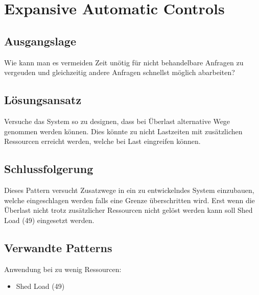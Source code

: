 \section{Expansive Automatic Controls}

\subsection{Ausgangslage}

Wie kann man es vermeiden Zeit unötig für nicht behandelbare Anfragen zu vergeuden und gleichzeitig andere Anfragen schnellst möglich abarbeiten?

\subsection{Lösungsansatz}

Versuche das System so zu designen, dass bei Überlast alternative Wege genommen werden können. Dies könnte zu nicht Lastzeiten mit zusätzlichen Ressourcen erreicht werden, welche bei Last eingreifen können.

\subsection{Schlussfolgerung}

Dieses Pattern versucht Zusatzwege in ein zu entwickelndes System einzubauen, welche eingeschlagen werden falls eine Grenze überschritten wird. Erst wenn die Überlast nicht trotz zusätzlicher Ressourcen nicht gelöst werden kann soll Shed Load (49) eingesetzt werden.

\subsection{Verwandte Patterns}

Anwendung bei zu wenig Ressourcen:
\begin{itemize}
	\item Shed Load (49)
\end{itemize}


